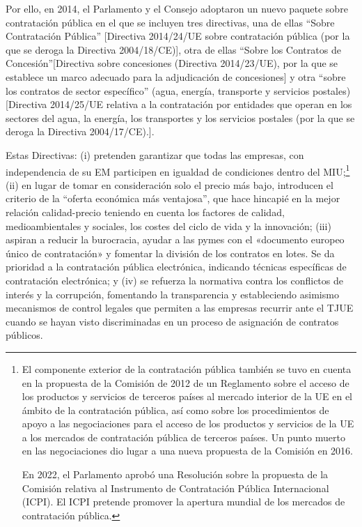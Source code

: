 \documentclass[10pt,a4paper]{article}
\begin{document}
Por ello, en 2014, el Parlamento y el Consejo adoptaron un nuevo paquete sobre contratación pública en el que se incluyen tres directivas, una de ellas “Sobre Contratación Pública” [Directiva 2014/24/UE sobre contratación pública (por la que se deroga la Directiva 2004/18/CE)], otra de ellas “Sobre los Contratos de Concesión”[Directiva sobre concesiones (Directiva 2014/23/UE), por la que se establece un marco adecuado para la adjudicación de concesiones] y otra “sobre los contratos de sector específico” (agua, energía, transporte y servicios postales) [Directiva 2014/25/UE relativa a la contratación por entidades que operan en los sectores del agua, la energía, los transportes y los servicios postales (por la que se deroga la Directiva 2004/17/CE).]. 

Estas Directivas: 
(i) pretenden garantizar que todas las empresas, con independencia de su EM participen en igualdad de condiciones dentro del MIU;\footnote{%
    El componente exterior de la contratación pública también se tuvo en cuenta en la propuesta de la Comisión de 2012 de un Reglamento sobre el acceso de los productos y servicios de terceros países al mercado interior de la UE en el ámbito de la contratación pública, así como sobre los procedimientos de apoyo a las negociaciones para el acceso de los productos y servicios de la UE a los mercados de contratación pública de terceros países. Un punto muerto en las negociaciones dio lugar a una nueva propuesta de la Comisión en 2016.

En 2022, el Parlamento aprobó una Resolución sobre la propuesta de la Comisión relativa al Instrumento de Contratación Pública Internacional (ICPI). El ICPI pretende promover la apertura mundial de los mercados de contratación pública.
}
(ii) en lugar de tomar en consideración solo el precio más bajo, introducen el criterio de la “oferta económica más ventajosa”, que hace hincapié en la mejor relación calidad-precio teniendo en cuenta los factores de calidad, medioambientales y sociales, los costes del ciclo de vida y la innovación;
(iii) aspiran a reducir la burocracia, ayudar a las pymes con el «documento europeo único de contratación» y fomentar la división de los contratos en lotes. Se da prioridad a la contratación pública electrónica, indicando técnicas específicas de contratación electrónica; y
(iv) se refuerza la normativa contra los conflictos de interés y la corrupción, fomentando la transparencia y estableciendo asimismo mecanismos de control legales que permiten a las empresas recurrir ante el TJUE cuando se hayan visto discriminadas en un proceso de asignación de contratos públicos.
 
\end{document}
